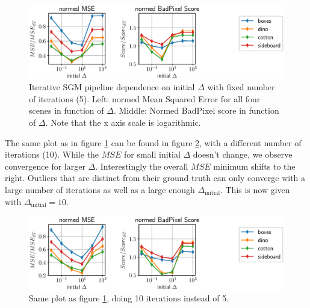 \documentclass  [
  paper    = a4,
  BCOR     = 10mm,
  twoside,
  fontsize = 12pt,
  fleqn,
  toc      = bibnumbered,
  toc      = listofnumbered,
  numbers  = noendperiod,
  headings = normal,
  listof   = leveldown,
  version  = 3.03
]                                       {scrreprt}
\begin{document}
\begin{figure}[h!]
	\centering
	\includegraphics[width=1\linewidth]{images/choose_lower_sgm_ppr_iterations_5_smoothing_delta}
	\caption[Iterative SGM dependence on initial $\Delta$ with 5 iterations]{Iterative SGM pipeline dependence on initial $\Delta$ with fixed number of iterations (5). Left: normed Mean Squared Error for all four scenes in function of $\Delta$. Middle: Normed BadPixel score in function of $\Delta$. Note that the x axis scale is logarithmic.}
	\label{fig:chooselowersgmppriterations5smoothingdelta}
\end{figure}
The same plot as in figure \ref{fig:chooselowersgmppriterations5smoothingdelta} can be found in figure \ref{fig:chooselowersgmppriterations10smoothingdelta}, with a different number of iterations (10). While the $MSE$ for small initial $\Delta$ doesn't change, we observe convergence for larger $\Delta$. Interestingly the overall $MSE$ minimum shifts to the right. Outliers that are distinct from their ground truth can only converge with a large number of iterations as well as a large enough $\Delta_\text{initial}$. This is now given with $\Delta_\text{initial} = 10$.
\begin{figure}[h!]
	\centering
	\includegraphics[width=1\linewidth]{images/choose_lower_sgm_ppr_iterations_10_smoothing_delta}
	\caption[Iterative SGM dependence on initial $\Delta$ with 10 iterations]{Same plot as figure \ref{fig:chooselowersgmppriterations5smoothingdelta}, doing 10 iterations instead of 5.}
	\label{fig:chooselowersgmppriterations10smoothingdelta}
\end{figure}
\end{document}
